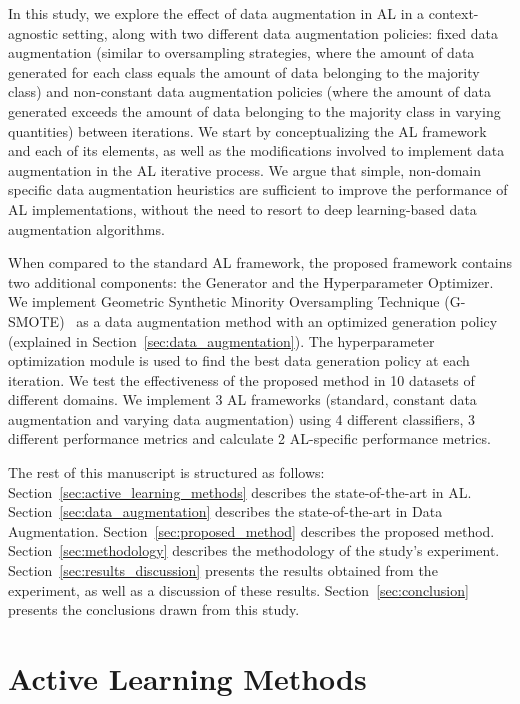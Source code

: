 \documentclass[preprint, 12pt]{elsarticle}
\begin{document}
In this study, we explore the effect of data augmentation in AL in a
context-agnostic setting, along with two different data augmentation policies:
fixed data augmentation (similar to oversampling strategies, where the amount of
data generated for each class equals the amount of data belonging to the
majority class) and non-constant data augmentation policies (where the amount of
data generated exceeds the amount of data belonging to the majority class in
varying quantities) between iterations. We start by conceptualizing the AL
framework and each of its elements, as well as the modifications involved to
implement data augmentation in the AL iterative process. We argue that simple,
non-domain specific data augmentation heuristics are sufficient to improve the
performance of AL implementations, without the need to resort to deep
learning-based data augmentation algorithms.

When compared to the standard AL framework, the proposed framework contains
two additional components: the Generator and the Hyperparameter Optimizer. We
implement Geometric Synthetic Minority Oversampling Technique
(G-SMOTE)~\cite{Douzas2019} as a data augmentation method with an optimized
generation policy (explained in Section~\ref{sec:data_augmentation}). The
hyperparameter optimization module is used to find the best data generation
policy at each iteration. We test the effectiveness of the proposed method in
10 datasets of different domains. We implement 3 AL frameworks (standard,
constant data augmentation and varying data augmentation) using 4 different
classifiers, 3 different performance metrics and calculate 2 AL-specific
performance metrics. 

The rest of this manuscript is structured as follows:
Section~\ref{sec:active_learning_methods} describes the state-of-the-art in
AL\@. Section~\ref{sec:data_augmentation} describes the state-of-the-art in Data
Augmentation. Section~\ref{sec:proposed_method} describes the proposed method.
Section~\ref{sec:methodology} describes the methodology of the study's
experiment. Section~\ref{sec:results_discussion} presents the results obtained
from the experiment, as well as a discussion of these results.
Section~\ref{sec:conclusion} presents the conclusions drawn from this study.
 
\section{Active Learning Methods}~\label{sec:active_learning_methods}
\end{document}
